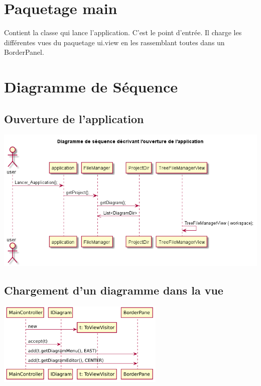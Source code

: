 \documentclass[a4paper,10pt]{article}
\begin{document}
\section{Paquetage main}
    Contient la classe qui lance l'application. C'est le point d'entrée. Il charge les différentes vues du paquetage ui.view en les rassemblant toutes dans un BorderPanel.
    
\section{Diagramme de Séquence}
  \subsection{Ouverture de l'application}
  \begin{center}
	     \includegraphics[width=14cm]{Image/Diag_Seq_Open.png}
   \end{center}
    
   \subsection{Chargement d'un diagramme dans la vue}
   \begin{center}
	     \includegraphics[width=8cm]{Image/uiupdate.png}
   \end{center}
   
\end{document}
